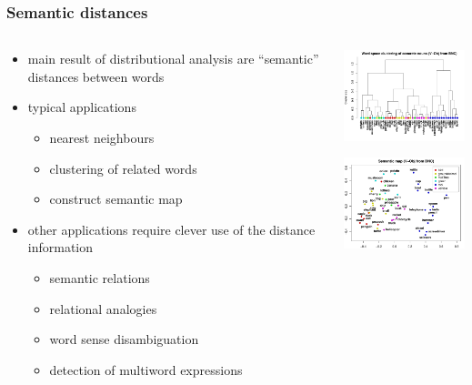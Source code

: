 \documentclass[t]{beamer} %
\begin{document}
\begin{frame}
  \frametitle{Semantic distances}

  \begin{columns}[T]
    \begin{column}{55mm}
      \begin{itemize}
      \item main result of distributional analysis are ``semantic'' distances between words
      \item typical applications
        \begin{itemize}
        \item nearest neighbours
        \item clustering of related words
        \item construct semantic map
        \end{itemize}
      \item other applications require clever use of the distance information
        \begin{itemize}
        \item semantic relations
        \item relational analogies
        \item word sense disambiguation
        \item detection of multiword expressions
        \end{itemize}
      \end{itemize}
    \end{column}
    \begin{column}{55mm}
      \ungap[1]
      \includegraphics[width=50mm]{img/hieroglyph_clustering}

      \gap[1]
      \includegraphics[width=50mm]{img/hieroglyph_semantic_map}
    \end{column}
  \end{columns}
\end{frame}
\end{document}
